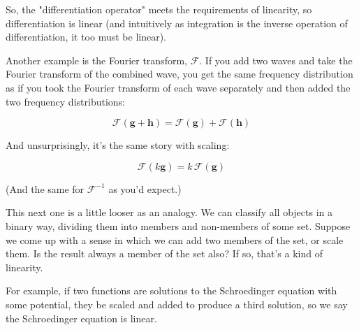 So, the "differentiation operator" meets the requirements of linearity, so differentiation is linear (and intuitively as integration is the inverse operation of differentiation, it too must be linear).

Another example is the Fourier transform, $\mathcal{F}$. If you add two waves and take the Fourier transform of the combined wave, you get the same frequency distribution as if you took the Fourier transform of each wave separately and then added the two frequency distributions:

$$\mathcal{F} (\mathbf{g} + \mathbf{h}) = \mathcal{F} (\mathbf{g}) + \mathcal{F} (\mathbf{h})$$

And unsurprisingly, it's the same story with scaling:

$$\mathcal{F} (k \mathbf{g}) = k \, \mathcal{F} (\mathbf{g})$$

(And the same for $\mathcal{F}^{-1}$ as you'd expect.)

This next one is a little looser as an analogy. We can classify all objects in a binary way, dividing them into members and non-members of some set. Suppose we come up with a sense in which we can add two members of the set, or scale them. Is the result always a member of the set also? If so, that's a kind of linearity.

For example, if two functions are solutions to the Schroedinger equation with some potential, they be scaled and added to produce a third solution, so we say the Schroedinger equation is linear.
